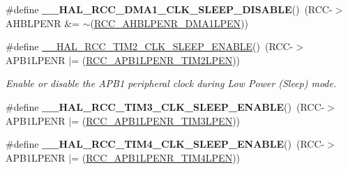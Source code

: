 \begin{DoxyCompactItemize}
\item 
\hypertarget{group___r_c_c___peripheral___clock___sleep___enable___disable_ga8786d21490439ef0564edff087203245}{\#define {\bfseries \-\_\-\-\_\-\-H\-A\-L\-\_\-\-R\-C\-C\-\_\-\-D\-M\-A1\-\_\-\-C\-L\-K\-\_\-\-S\-L\-E\-E\-P\-\_\-\-D\-I\-S\-A\-B\-L\-E}()~(R\-C\-C-\/$>$A\-H\-B\-L\-P\-E\-N\-R \&= $\sim$(\hyperlink{group___peripheral___registers___bits___definition_ga8053aa13396d01a92ab6668dc18024b1}{R\-C\-C\-\_\-\-A\-H\-B\-L\-P\-E\-N\-R\-\_\-\-D\-M\-A1\-L\-P\-E\-N}))}\label{group___r_c_c___peripheral___clock___sleep___enable___disable_ga8786d21490439ef0564edff087203245}

\item 
\#define \hyperlink{group___r_c_c___peripheral___clock___sleep___enable___disable_ga975142c90b4e1baf21b361524518235d}{\-\_\-\-\_\-\-H\-A\-L\-\_\-\-R\-C\-C\-\_\-\-T\-I\-M2\-\_\-\-C\-L\-K\-\_\-\-S\-L\-E\-E\-P\-\_\-\-E\-N\-A\-B\-L\-E}()~(R\-C\-C-\/$>$A\-P\-B1\-L\-P\-E\-N\-R $\vert$= (\hyperlink{group___peripheral___registers___bits___definition_ga1f561f8bfc556b52335ec2a32ba81c44}{R\-C\-C\-\_\-\-A\-P\-B1\-L\-P\-E\-N\-R\-\_\-\-T\-I\-M2\-L\-P\-E\-N}))
\begin{DoxyCompactList}\small\item\em Enable or disable the A\-P\-B1 peripheral clock during Low Power (Sleep) mode. \end{DoxyCompactList}\item 
\hypertarget{group___r_c_c___peripheral___clock___sleep___enable___disable_ga2e165dd342f4ab6ea9b2edab08723cf8}{\#define {\bfseries \-\_\-\-\_\-\-H\-A\-L\-\_\-\-R\-C\-C\-\_\-\-T\-I\-M3\-\_\-\-C\-L\-K\-\_\-\-S\-L\-E\-E\-P\-\_\-\-E\-N\-A\-B\-L\-E}()~(R\-C\-C-\/$>$A\-P\-B1\-L\-P\-E\-N\-R $\vert$= (\hyperlink{group___peripheral___registers___bits___definition_ga9391d99885a0a6fbaf3447117ac0f7aa}{R\-C\-C\-\_\-\-A\-P\-B1\-L\-P\-E\-N\-R\-\_\-\-T\-I\-M3\-L\-P\-E\-N}))}\label{group___r_c_c___peripheral___clock___sleep___enable___disable_ga2e165dd342f4ab6ea9b2edab08723cf8}

\item 
\hypertarget{group___r_c_c___peripheral___clock___sleep___enable___disable_ga7911836a0e66ab2e4719b298f74b783b}{\#define {\bfseries \-\_\-\-\_\-\-H\-A\-L\-\_\-\-R\-C\-C\-\_\-\-T\-I\-M4\-\_\-\-C\-L\-K\-\_\-\-S\-L\-E\-E\-P\-\_\-\-E\-N\-A\-B\-L\-E}()~(R\-C\-C-\/$>$A\-P\-B1\-L\-P\-E\-N\-R $\vert$= (\hyperlink{group___peripheral___registers___bits___definition_ga6f04aff278b72fbf6acbe0ad947b06ae}{R\-C\-C\-\_\-\-A\-P\-B1\-L\-P\-E\-N\-R\-\_\-\-T\-I\-M4\-L\-P\-E\-N}))}\label{group___r_c_c___peripheral___clock___sleep___enable___disable_ga7911836a0e66ab2e4719b298f74b783b}


\end{DoxyCompactItemize}
